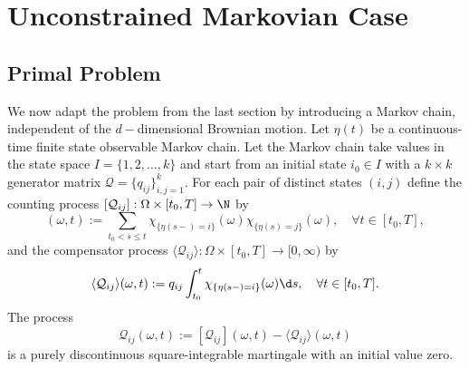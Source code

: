 \section{Unconstrained Markovian Case}


\subsection{Primal Problem}
We now adapt the problem from the last section by introducing a Markov chain, independent of the $d-$dimensional Brownian motion. Let $\eta(t)$ be a continuous-time finite state observable Markov chain. Let the Markov chain take values in the state space $I = \{ 1, 2, \dots, k\}$ and start from an initial state $i_0 \in I$ with a $k \times k$ generator matrix $\mathcal{Q} = \{ {q}_{i j} \}_{i,j = 1}^k$. For each pair of distinct states $(i,j)$ define the counting process $[\mathcal{Q}_{ij}] : \Omega \times [t_0, T] \to \N$ by
\begin{equation*}
    [\mathcal{Q}_{ij}](\omega, t):= \sum_{t_0 < s \le t} \chi_{ \{\eta(s-) = i\}}(\omega) \chi_{\{ \eta(s) = j \}}(\omega), \quad \forall t \in [t_0, T],
\end{equation*}
and the compensator process $\langle \mathcal{Q}_{ij} \rangle: \Omega \times [t_0, T] \to [0, \infty)$ by
\begin{equation*}
    \langle \mathcal{Q}_{ij} \rangle (\omega, t) := q_{ij} \int_{t_0}^t \chi_{\{ \eta(s-)=i \}}(\omega) \d s, \quad \forall t \in [t_0, T].
\end{equation*}
The process
\begin{equation*}
    \mathcal{Q}_{ij}(\omega, t) := [\mathcal{Q}_{ij}](\omega, t) - \langle \mathcal{Q}_{ij} \rangle (\omega, t)
\end{equation*}
is a purely discontinuous square-integrable martingale with an initial value zero.\\

